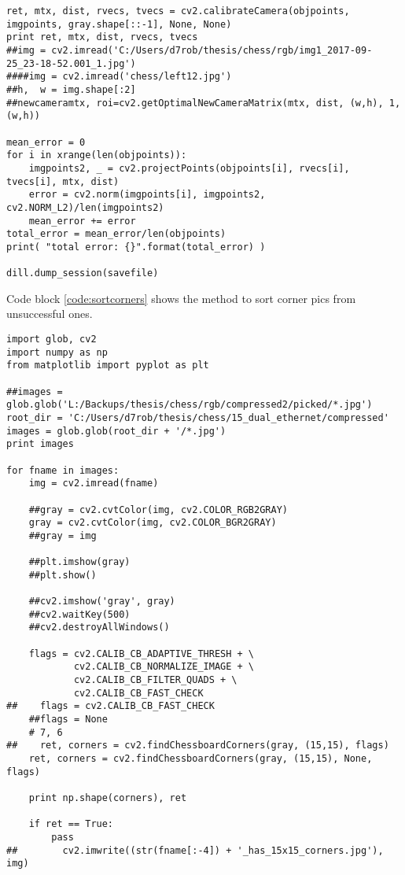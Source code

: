 \begin{appendices}
\begin{lstlisting}
ret, mtx, dist, rvecs, tvecs = cv2.calibrateCamera(objpoints, imgpoints, gray.shape[::-1], None, None)
print ret, mtx, dist, rvecs, tvecs
##img = cv2.imread('C:/Users/d7rob/thesis/chess/rgb/img1_2017-09-25_23-18-52.001_1.jpg')
####img = cv2.imread('chess/left12.jpg')
##h,  w = img.shape[:2]
##newcameramtx, roi=cv2.getOptimalNewCameraMatrix(mtx, dist, (w,h), 1, (w,h))

mean_error = 0
for i in xrange(len(objpoints)):
    imgpoints2, _ = cv2.projectPoints(objpoints[i], rvecs[i], tvecs[i], mtx, dist)
    error = cv2.norm(imgpoints[i], imgpoints2, cv2.NORM_L2)/len(imgpoints2)
    mean_error += error
total_error = mean_error/len(objpoints)
print( "total error: {}".format(total_error) )

dill.dump_session(savefile)

\end{lstlisting}

\newpage
Code block \ref{code:sortcorners} shows the method to sort corner pics from unsuccessful ones.

\begin{lstlisting}
import glob, cv2
import numpy as np
from matplotlib import pyplot as plt

##images = glob.glob('L:/Backups/thesis/chess/rgb/compressed2/picked/*.jpg')
root_dir = 'C:/Users/d7rob/thesis/chess/15_dual_ethernet/compressed'
images = glob.glob(root_dir + '/*.jpg')
print images

for fname in images:
    img = cv2.imread(fname)

    ##gray = cv2.cvtColor(img, cv2.COLOR_RGB2GRAY)
    gray = cv2.cvtColor(img, cv2.COLOR_BGR2GRAY)
    ##gray = img

    ##plt.imshow(gray)
    ##plt.show()

    ##cv2.imshow('gray', gray)
    ##cv2.waitKey(500)
    ##cv2.destroyAllWindows()

    flags = cv2.CALIB_CB_ADAPTIVE_THRESH + \
            cv2.CALIB_CB_NORMALIZE_IMAGE + \
            cv2.CALIB_CB_FILTER_QUADS + \
            cv2.CALIB_CB_FAST_CHECK
##    flags = cv2.CALIB_CB_FAST_CHECK
    ##flags = None
    # 7, 6
##    ret, corners = cv2.findChessboardCorners(gray, (15,15), flags)
    ret, corners = cv2.findChessboardCorners(gray, (15,15), None, flags)

    print np.shape(corners), ret

    if ret == True:
        pass
##        cv2.imwrite((str(fname[:-4]) + '_has_15x15_corners.jpg'), img)


\end{lstlisting}
\end{appendices}
